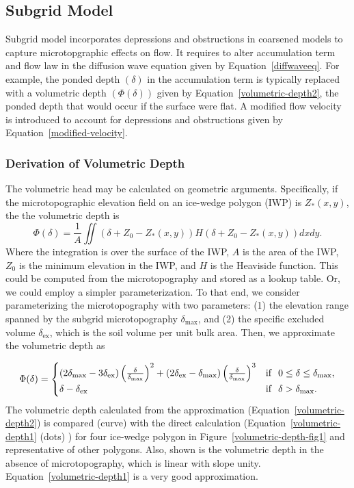 \documentclass[review,11pt]{elsarticle}
\begin{document}
\subsection{Subgrid Model}\label{subgridmodel}
Subgrid model incorporates depressions and obstructions in coarsened models to capture microtopgraphic effects on flow. It requires to alter accumulation term and flow law in the diffusion wave equation given by Equation~\ref{diffwaveeq}.
For example, the ponded depth $(\delta)$ in the accumulation term is typically replaced with a volumetric depth $(\Phi (\delta))$ given by Equation~\ref{volumetric-depth2}, the ponded depth that would occur if the surface were flat. A modified flow velocity is introduced to account for depressions and obstructions given by Equation~\ref{modified-velocity}.

\subsubsection{Derivation of Volumetric Depth}

The volumetric head may be calculated on geometric arguments. Specifically, if the microtopographic elevation field on an ice-wedge polygon (IWP) is $Z_*(x,y)$, the the volumetric depth is
\begin{equation}\label{volumetric-depth1}
\Phi (\delta) = \frac{1}{A} \iint \left( \delta + Z_0 - Z_*(x,y) \right ) H \left( \delta + Z_0 - Z_*(x,y) \right ) dx dy.
\end{equation}
Where the integration is over the surface of the IWP, $A$ is the area of the IWP, $Z_0$ is the minimum elevation in the IWP, and $H$ is the Heaviside function. This could be computed from the microtopography and stored as a lookup table. Or, we could employ a simpler parameterization. To that end, we consider parameterizing the microtopography with two parameters: (1) the elevation range spanned by the subgrid microtopography $\delta_\text{max}$, and (2) the specific excluded volume $\delta_\text{ex}$, which is the soil volume per unit bulk area. Then, we approximate the volumetric depth as

\begin{equation}\label{volumetric-depth2}
\Phi (\delta) =
\begin{cases} (2 \delta_\text{max} - 3 \delta_\text{ex}) \left(\frac{\delta}{\delta_\text{max}} \right )^2 + (2 \delta_\text{ex} -  \delta_\text{max}) \left(\frac{\delta}{\delta_\text{max}} \right )^3 & \text{if} \hskip 0.1in 0 \leq \delta \leq \delta_\text{max}, \\
\delta - \delta_\text{ex} & \text{if} \hskip .1in \delta > \delta_\text{max}.
\end{cases}
\end{equation}
The volumetric depth calculated from the approximation (Equation~\ref{volumetric-depth2}) is compared (curve) with the direct calculation (Equation~\ref{volumetric-depth1} (dots) ) for four ice-wedge polygon in Figure~\ref{volumetric-depth-fig1} and representative of other polygons. Also, shown is the volumetric depth in the absence of microtopography, which is linear with slope unity. Equation~\ref{volumetric-depth1} is a very good approximation.
\end{document}
